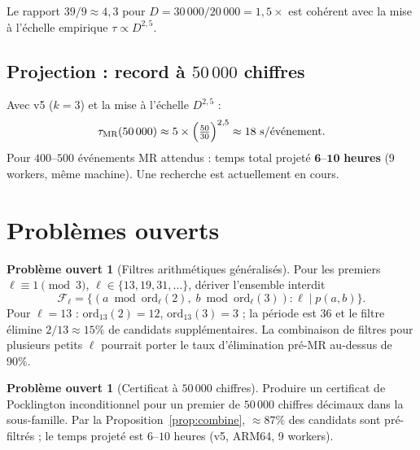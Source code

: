 \documentclass[11pt,a4paper]{article}
\theoremstyle{definition}
\newtheorem{probleme}[theoreme]{Problème ouvert}
\theoremstyle{remark}
\newcommand{\F}{\mathcal{F}}
\begin{document}
Le rapport $39/9 \approx 4{,}3$ pour $D = 30\,000/20\,000 = 1{,}5\times$
est cohérent avec la mise à l'échelle empirique $\tau \propto D^{2,5}$.

\subsection{Projection : record à $50\,000$ chiffres}

Avec v5 ($k=3$) et la mise à l'échelle $D^{2,5}$ :
\[
  \tau_{\text{MR}}(50\,000) \approx 5 \times\Bigl(\tfrac{50}{30}\Bigr)^{2,5}
  \approx 18\text{ s/événement}.
\]
Pour $400$--$500$ événements MR attendus : temps total projeté
$\mathbf{6}$--$\mathbf{10}$ \textbf{heures} (9 workers, même machine).
Une recherche est actuellement en cours.

\section{Problèmes ouverts}\label{sec:ouverts}

\begin{openprobbox}
\begin{probleme}[Filtres arithmétiques généralisés]\label{op:filtre-gen}
Pour les premiers $\ell\equiv 1\pmod{3}$, $\ell\in\{13,19,31,\ldots\}$,
dériver l'ensemble interdit
\[
  \F_\ell = \bigl\{(a\bmod\mathrm{ord}_\ell(2),\;
                    b\bmod\mathrm{ord}_\ell(3)) : \ell\mid p(a,b)\bigr\}.
\]
Pour $\ell=13$ : $\mathrm{ord}_{13}(2)=12$, $\mathrm{ord}_{13}(3)=3$ ;
la période est $36$ et le filtre élimine $2/13\approx 15\%$ de candidats
supplémentaires. La combinaison de filtres pour plusieurs petits $\ell$
pourrait porter le taux d'élimination pré-MR au-dessus de $90\%$.
\end{probleme}
\end{openprobbox}

\begin{openprobbox}
\begin{probleme}[Certificat à $50\,000$ chiffres]\label{op:50k}
Produire un certificat de Pocklington inconditionnel pour un premier de
$50\,000$ chiffres décimaux dans la sous-famille. Par la
Proposition~\ref{prop:combine}, $\approx 87\%$ des candidats sont
pré-filtrés ; le temps projeté est $6$--$10$ heures (v5, ARM64, 9 workers).
\end{probleme}
\end{openprobbox}
\end{document}
